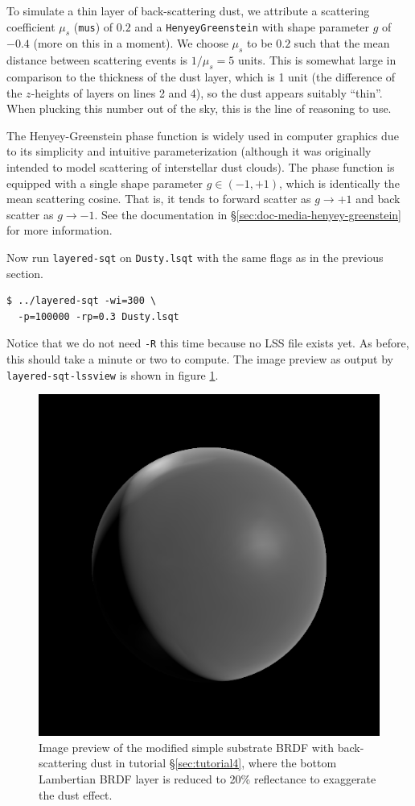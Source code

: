 \documentclass[
    twoside,
    twocolumn,
    letterpaper,
    10pt]{article}
\newcommand\namett[2]{{\color{code#1}\texttt{#2}}}
\begin{document}
To simulate a thin layer of back-scattering dust, 
we attribute a scattering coefficient $\mu_s$ (\texttt{mus}) of $0.2$ and 
a \namett{purple}{HenyeyGreenstein} with shape parameter $g$ of $-0.4$
(more on this in a moment). We choose $\mu_s$ to be $0.2$ such that the mean 
distance between scattering events is $1/\mu_s = 5$ units. This is somewhat 
large in comparison to the thickness of the dust layer, which is 1 unit 
(the difference of the $z$-heights of layers on lines 2 and 4), so the dust
appears suitably ``thin''. When plucking this number out of the sky, this is 
the line of reasoning to use. 

The Henyey-Greenstein phase function is widely used in computer graphics
due to its simplicity and intuitive parameterization (although it was 
originally intended to model scattering of interstellar dust clouds). The
phase function is equipped with a single shape parameter $g \in (-1, +1)$,
which is identically the mean scattering cosine. That is, it tends to
forward scatter as $g \to +1$ and back scatter as $g \to -1$. See the
documentation in \S\ref{sec:doc-media-henyey-greenstein} for more
information.

Now run \texttt{layered-sqt} on \texttt{Dusty.lsqt} with the same flags as in
the previous section.
\begin{verbatim}
$ ../layered-sqt -wi=300 \
  -p=100000 -rp=0.3 Dusty.lsqt
\end{verbatim}
Notice that we do not need \texttt{-R} this time because no LSS file 
exists yet. As before, this should take a minute or two to compute.
The image preview as output by \texttt{layered-sqt-lssview} is shown in
figure \ref{fig:tutorial4}.

\begin{figure}
\begin{center}
    \includegraphics[width=0.75\columnwidth]{tutorial4.png}
    \caption{Image preview of the modified simple substrate BRDF with 
    back-scattering
    dust in tutorial \S\ref{sec:tutorial4}, where the bottom Lambertian BRDF 
    layer is reduced to 20\% reflectance to exaggerate the dust effect.
    \label{fig:tutorial4}}
\end{center}
\end{figure}
\end{document}
